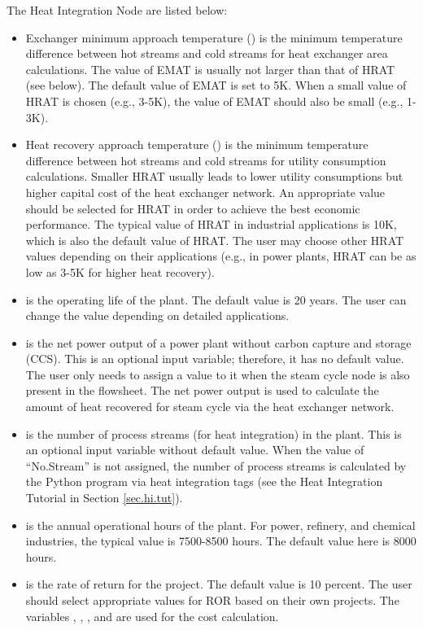 The Heat Integration Node  are listed below:
\begin{itemize}
	\item Exchanger minimum approach temperature () is the minimum temperature difference between hot streams and cold streams for heat exchanger area calculations. The value of EMAT is usually not larger than that of HRAT (see below). The default value of EMAT is set to 5K. When a small value of HRAT is chosen (e.g., 3-5K), the value of EMAT should also be small (e.g., 1-3K).
	\item Heat recovery approach temperature () is the minimum temperature difference between hot streams and cold streams for utility consumption calculations. Smaller HRAT usually leads to lower utility consumptions but higher capital cost of the heat exchanger network. An appropriate value should be selected for HRAT in order to achieve the best economic performance. The typical value of HRAT in industrial applications is 10K, which is also the default value of HRAT. The user may choose other HRAT values depending on their applications (e.g., in power plants, HRAT can be as low as 3-5K for higher heat recovery).
	\item {} is the operating life of the plant. The default value is 20 years. The user can change the value depending on detailed applications.
	\item {} is the net power output of a power plant without carbon capture and storage (CCS). This is an optional input variable; therefore, it has no default value. The user only needs to assign a value to it when the steam cycle node is also present in the flowsheet. The net power output is used to calculate the amount of heat recovered for steam cycle via the heat exchanger network.
	\item {} is the number of process streams (for heat integration) in the plant. This is an optional input variable without default value. When the value of ``No.Stream'' is not assigned, the number of process streams is calculated by the Python program via heat integration tags (see the Heat Integration Tutorial in Section \ref{sec.hi.tut}).
	\item {} is the annual operational hours of the plant. For power, refinery, and chemical industries, the typical value is 7500-8500 hours. The default value here is 8000 hours.
	\item {} is the rate of return for the project. The default value is 10 percent. The user should select appropriate values for ROR based on their own projects. The variables , , , and  are used for the cost calculation. 
\end{itemize}


